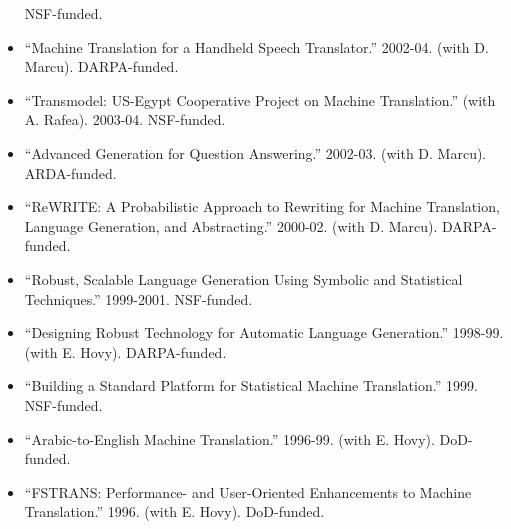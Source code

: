 \begin{itemize}
NSF-funded. %
\item ``Machine Translation for a Handheld Speech Translator.'' 2002-04. (with D. Marcu).
DARPA-funded. %
\item ``Transmodel: US-Egypt Cooperative Project on Machine Translation.'' (with A. Rafea).
2003-04.  NSF-funded.%
\item ``Advanced Generation for Question Answering.'' 2002-03. (with D. Marcu).
ARDA-funded. %
\item ``ReWRITE:  A Probabilistic Approach to Rewriting for
Machine Translation, Language Generation, and Abstracting.'' 2000-02. (with D. Marcu). 
DARPA-funded. %
\item ``Robust, Scalable Language Generation Using Symbolic and 
Statistical Techniques.''  1999-2001.  NSF-funded. %
\item ``Designing Robust Technology for Automatic Language Generation.''  
1998-99.  (with E. Hovy).  DARPA-funded. %
\item ``Building a Standard Platform for Statistical Machine Translation.''  
1999.  NSF-funded. %
\item ``Arabic-to-English Machine Translation.''  1996-99. (with E. Hovy). 
DoD-funded. %
\item ``FSTRANS: Performance- and User-Oriented Enhancements to 
Machine Translation.'' 1996.  (with E. Hovy).  DoD-funded. %
\end{itemize}


